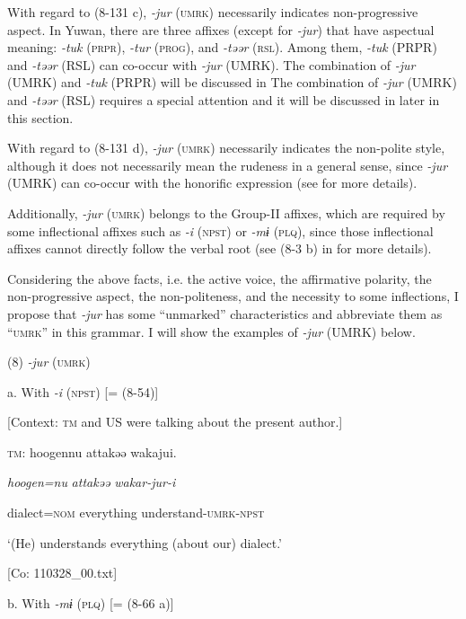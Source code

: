   With regard to (8-131 c), \textit{{}-jur} (\textsc{umrk}) necessarily indicates non-progressive aspect. In Yuwan, there are three affixes (except for \textit{{}-jur}) that have aspectual meaning: \textit{{}-tuk} (\textsc{prpr}), \textit{{}-tur} (\textsc{prog}), and \textit{{}-təər} (\textsc{rsl}). Among them, \textit{{}-tuk} (PRPR) and \textit{{}-təər} (RSL) can co-occur with \textit{{}-jur} (UMRK). The combination of \textit{{}-jur} (UMRK) and \textit{{}-tuk} (PRPR) will be discussed in  The combination of \textit{{}-jur} (UMRK) and \textit{{}-təər} (RSL) requires a special attention and it will be discussed in later in this section.

With regard to (8-131 d), \textit{{}-jur} (\textsc{umrk}) necessarily indicates the non-polite style, although it does not necessarily mean the rudeness in a general sense, since \textit{{}-jur} (UMRK) can co-occur with the honorific expression (see  for more details).

Additionally, \textit{{}-jur} (\textsc{umrk}) belongs to the Group-II affixes, which are required by some inflectional affixes such as \textit{{}-i} (\textsc{npst}) or \textit{{}-mɨ} (\textsc{plq}), since those inflectional affixes cannot directly follow the verbal root (see (8-3 b) in  for more details).

  Considering the above facts, i.e. the active voice, the affirmative polarity, the non-progressive aspect, the non-politeness, and the necessity to some inflections, I propose that \textit{{}-jur} has some “unmarked” characteristics and abbreviate them as “\textsc{umrk}” in this grammar. I will show the examples of \textit{{}-jur} (UMRK) below.

(8)  \textit{{}-jur} (\textsc{umrk})

  a. With \textit{{}-i} (\textsc{npst}) [= (8-54)]

  [Context: \textsc{tm} and US were talking about the present author.]

  \textsc{tm}:  {\textbar}hoogen{\textbar}nu  attakəə  wakajui.

    \textit{hoogen=nu}  \textit{attakəə}  \textit{wakar-jur-i}

    dialect=\textsc{nom}  everything  understand-\textsc{umrk}-\textsc{npst}

    ‘(He) understands everything (about our) dialect.’

    [Co: 110328\_00.txt]

  b. With \textit{{}-mɨ} (\textsc{plq}) [= (8-66 a)]

